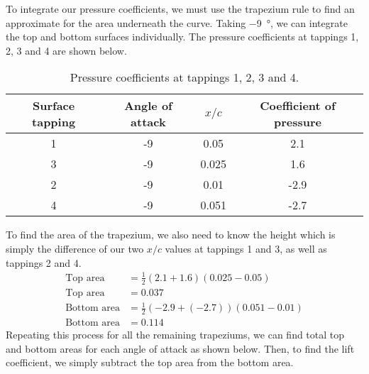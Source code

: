 To integrate our pressure coefficients, we must use the trapezium rule to find an approximate for the area underneath the curve. Taking \SI{-9}{\degree}, we can integrate the top and bottom surfaces individually. The pressure coefficients at tappings 1, 2, 3 and 4 are shown below.
\begin{table}[H]
    \centering
    \label{q2bvals}
    \begin{tabular}{||c|c|c|c||}
        \hline
        \textbf{Surface tapping} & \textbf{Angle of attack} & $x/c$ & \textbf{Coefficient of pressure} \\
        \hline
        \hline
        1                        & -9                       & 0.05  & 2.1                              \\
        3                        & -9                       & 0.025 & 1.6                              \\
        2                        & -9                       & 0.01  & -2.9                             \\
        4                        & -9                       & 0.051 & -2.7                             \\
        \hline
    \end{tabular}
    \caption{Pressure coefficients at tappings 1, 2, 3 and 4.}
\end{table}
To find the area of the trapezium, we also need to know the height which is simply the difference of our two $x/c$ values at tappings 1 and 3, as well as tappings 2 and 4.
\begin{align}
    \textrm{Top area}    & = \frac{1}{2}\left(2.1 + 1.6\right)(0.025 -0.05)               \\
    \textrm{Top area}    & = 0.037                                                        \\
    \textrm{Bottom area} & = \frac{1}{2}\left(-2.9 + \left(-2.7\right)\right)(0.051-0.01) \\
    \textrm{Bottom area} & = 0.114
\end{align}
Repeating this process for all the remaining trapeziums, we can find total top and bottom areas for each angle of attack as shown below. Then, to find the lift coefficient, we simply subtract the top area from the bottom area.
